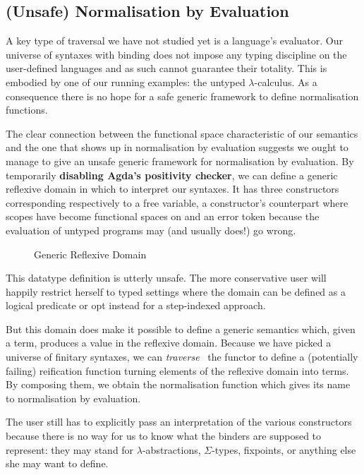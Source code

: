 \subsection{(Unsafe) Normalisation by Evaluation}

A key type of traversal we have not studied yet is a language's
evaluator. Our universe of syntaxes with binding does not impose
any typing discipline on the user-defined languages and as such
cannot guarantee their totality. This is embodied by one of our running
examples: the untyped $\lambda$-calculus. As a consequence there
is no hope for a safe generic framework to define normalisation
functions.

The clear connection between the  functional space
characteristic of our semantics and the one that shows up in
normalisation by evaluation suggests we ought to manage to
give an unsafe generic framework for normalisation by evaluation.
By temporarily \textbf{disabling Agda's positivity checker},
we can define a generic reflexive domain  in which to
interpret our syntaxes. It has three constructors corresponding
respectively to a free variable, a constructor's counterpart where
scopes have become  functional spaces on  and
an error token because the evaluation of untyped programs may
(and usually does!) go wrong.

\begin{figure}[h]
\caption{Generic Reflexive Domain}
\end{figure}

This datatype definition is utterly unsafe. The more conservative
user will happily restrict herself to typed settings where the
domain can be defined as a logical predicate or opt instead for
a step-indexed approach.

But this domain does make it possible to define a generic 
semantics which, given a term, produces a value in the reflexive
domain. Because we have picked a universe of finitary syntaxes, we
can \emph{traverse}~\cite{mcbride_paterson_2008} the functor to define
a (potentially failing) reification function turning elements of the
reflexive domain into terms. By composing them, we obtain the
normalisation function which gives its name to normalisation by
evaluation.

The user still has to explicitly pass an interpretation of
the various constructors because there is no way for us to
know what the binders are supposed to represent: they may
stand for $\lambda$-abstractions, $\Sigma$-types, fixpoints, or
anything else she may want to define.


